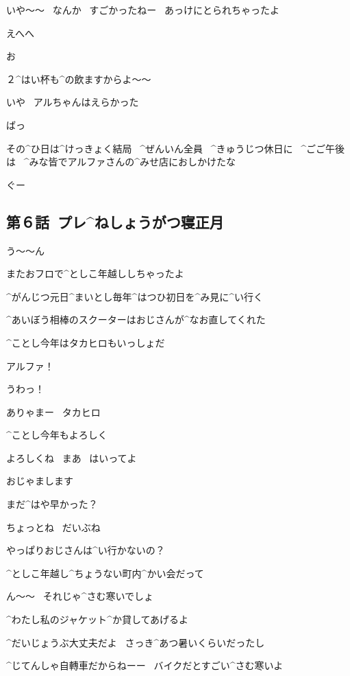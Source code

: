 \Person いや〜〜
\ なんか
\ すごかったねー
\ あっけにとられちゃったよ

\Alpha えへへ

\page
\Person お

\Ojisan ２^{はい}{杯}も^{の}{飲}ますからよ〜〜

\Person いや
\ アルちゃんはえらかった

\page
\Alpha ばっ

\Narrator その^{ひ}{日}は^{けっきょく}{結局}
\ ^{ぜんいん}{全員}
\ ^{きゅうじつ}{休日}に
\ ^{ごご}{午後}は
\ ^{みな}{皆}でアルファさんの^{みせ}{店}におしかけたな

\Alpha ぐー


\subsection{第６話\ プレ^{ねしょうがつ}{寝正月}}

\page[116]
\Alpha う〜〜ん

\Alpha またおフロで^{としこ}{年越}ししちゃったよ

\Alpha ^{がんじつ}{元日}^{まいとし}{毎年}^{はつひ}{初日}を^{み}{見}に^{い}{行}く

\Alpha ^{あいぼう}{相棒}のスクーターはおじさんが^{なお}{直}してくれた

\page
\Alpha ^{ことし}{今年}はタカヒロもいっしょだ

\Takahiro アルファ！

\Alpha うわっ！

\page
\Alpha ありゃまー
\ タカヒロ

\Takahiro ^{ことし}{今年}もよろしく

\Alpha よろしくね
\ まあ
\ はいってよ

\Takahiro おじゃまします

\Takahiro まだ^{はや}{早}かった？

\Alpha ちょっとね
\ だいぶね

\Alpha やっぱりおじさんは^{い}{行}かないの？

\Takahiro ^{としこ}{年越}し^{ちょうない}{町内}^{かい}{会}だって

\page
\Alpha ん〜〜
\ それじゃ^{さむ}{寒}いでしょ

\Alpha ^{わたし}{私}のジャケット^{か}{貸}してあげるよ

\Takahiro ^{だいじょうぶ}{大丈夫}だよ
\ さっき^{あつ}{暑}いくらいだったし

\Alpha ^{じてんしゃ}{自轉車}だからねーー
\ バイクだとすごい^{さむ}{寒}いよ

